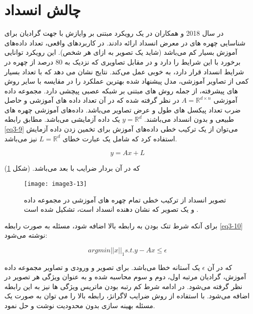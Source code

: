 \section{چالش انسداد}
در سال 2018  و همکاران در \cite{WU2018256} یک رویکرد مبتنی بر وايازش  با جهت گرادیان برای شناسایی چهره های در معرض انسداد ارائه دادند. در کاربردهای واقعی، تعداد داده‌های آموزش بسیار کم می‌باشد (شاید یک تصویر به ازای هر شخص). این رویکرد توانایی برخورد با این شرایط را دارد و در مقابل تصاویری که نزدیک به 80 درصد از چهره در شرایط انسداد قرار دارد، به خوبی عمل می‌کند. نتایج نشان می دهد که با تعداد بسیار کمی از تصاویر آموزشی، مدل پیشنهاد شده  بهترین عملکرد را در مقایسه با سایر روش های پیشرفته، از جمله روش های مبتنی بر شبکه عصبی پیچشی دارد. مجموعه داده آموزشی $A=\mathbb{R}^{d\times n}$ در نظر گرفته شده که در آن  تعداد داده های آموزشی و  حاصل ضرب تعداد پیکسل های طول و عرض تصاویر می‌باشد. داده‌های آموزشی چهره های طبیعی و بدون انسداد می‌باشند. $y=\mathbb{R}^d$ یک داده آزمایشی می‌باشد. مطابق رابطه \ref{eq3-9} می‌توان از یک ترکیب خطی داده‌های آموزش برای تخمین زدن داده آزمایش استفاده کرد که شامل یک عبارت خطای $L=\mathbb{R}^d$ نیز می‌باشد.
 
\begin{equation}
\label{eq3-9}
y=Ax+L
\end{equation}

\noindent‏
که در آن  بردار ضرایب با  بعد می‌باشد. (شکل \ref{image3-13})

\begin{figure}[h]
\centering
  \texttt{[image: image3-13]}
  \caption{تصویر انسداد از ترکیب خطی تمام چهره های آموزشی در مجموعه داده و یک تصویر  که نشان دهنده انسداد است، تشکیل شده است \cite{WU2018256}.}
  \label{image3-13}
\end{figure}

\noindent
برای آنکه شرط تنک بودن به رابطه بالا اضافه شود، مسئله به صورت رابطه \ref{eq3-10} نوشته می‌شود:

\begin{equation}
\label{eq3-10}
arg min ||x||_1   s.t. y - Ax ≤ \epsilon 	
\end{equation}

\noindent‏
که در آن $\epsilon$ یک آستانه خطا می‌باشد. برای تصویر و ورودی و تصاویر مجموعه داده آموزش، گرادیان مرتبه اول، دوم و سوم محاسبه شده و به عنوان ویژگی هر تصویر در نظر گرفته می‌شود. در ادامه شرط کم رتبه بودن ماتریس ویژگی ها نیز به این رابطه اضافه می‌شود. با استفاده از روش ضرایب لاگرانژ، رابطه بالا را می توان به صورت یک مسئله بهینه سازی بدون محدودیت نوشت و حل نمود.

